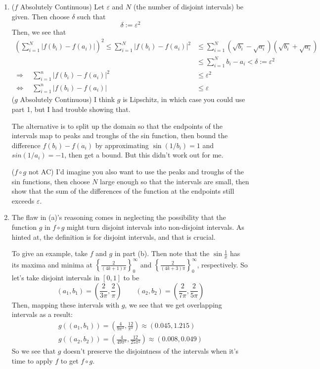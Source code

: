 \documentclass[12pt]{article}
\theoremstyle{plain}
\theoremstyle{definition}
\theoremstyle{remark}
\begin{document}
\begin{enumerate}
\begin{enumerate}
\item ($f$ Absolutely Continuous) Let $\varepsilon$ and $N$ (the number of disjoint intervals) be given. Then choose $\delta$ such that 
\begin{equation}
    \label{q2b}
    \delta:= \varepsilon^2
\end{equation}
Then, we see that 
\begin{align*}
    \left(\sum_{i=1}^N
    |f({b_i})-f({a_i})|\right)^2 \leq 
    \sum_{i=1}^N
    |f({b_i})-f({a_i})|^2 
    &\leq
    \sum_{i=1}^N
    \left(\sqrt{b_i}-\sqrt{a_i}\right)\left(\sqrt{b_i}+\sqrt{a_i}\right)  \\
    &\leq \sum_{i=1}^N b_i - a_i < \delta := {\varepsilon^2} \\
    \Rightarrow\quad
    \sum_{i=1}^n|f({b_i})-f({a_i})|^2 &\leq {\varepsilon^2} \\
    \Leftrightarrow\quad
    \sum_{i=1}^n|f({b_i})-f({a_i})| &\leq {\varepsilon} 
\end{align*}
($g$ Absolutely Continuous) I think $g$ is Lipschitz, in which  case you could use part 1, but I had trouble showing that.

The alternative is to split up the domain so that the endpoints of the intervals map to peaks and troughs of the sin function, then bound the difference $f(b_i)-f(a_i)$ by approximating $\sin(1/b_i)=1$ and $sin(1/a_i)=-1$, then get a bound. But this didn't work out for me.

($f\circ g$ not AC) I'd imagine you also want to use the peaks and troughs of the sin functions, then choose $N$ large enough so that the intervals are small, then show that the sum of the differences of the function at the endpoints still exceeds $\varepsilon$.


\item The flaw in (a)'s reasoning comes in neglecting the possibility that the function $g$ in $f\circ g$ might turn disjoint intervals into non-disjoint intervals. As hinted at, the definition is for disjoint intervals, and that is crucial.

To give an example, take $f$ and $g$ in part (b). Then note that the $\sin\frac{1}{x}$ has its maxima and minima at $\left\{\frac{2}{(4k+1)\pi}\right\}_0^\infty$ and $\left\{\frac{2}{(4k+3)\pi}\right\}_0^\infty$, respectively. So let's take disjoint intervals in $[0,1]$ to be
\[
    (a_1,b_1) = \left(\frac{2}{3\pi}, \frac{2}{\pi}\right)
    \qquad
    (a_2,b_2) = \left(\frac{2}{7\pi}, \frac{2}{5\pi}\right)
\]
Then, mapping these intervals with $g$, we see that we get overlapping intervals as a result:
\begin{align*}
    g((a_1,b_1)) = \left(\frac{4}{9\pi^2}, \frac{12}{\pi^2}\right)
    \approx (0.045, 1.215)\\
    g((a_2,b_2)) = \left(\frac{4}{49\pi^2}, 
    \frac{12}{25\pi^2}\right)
    \approx (0.008, 0.049)
\end{align*}
So we see that $g$ doesn't preserve the disjointness of the intervals when it's time to apply $f$ to get $f\circ g$.



\end{enumerate}
\end{enumerate}
\end{document}
